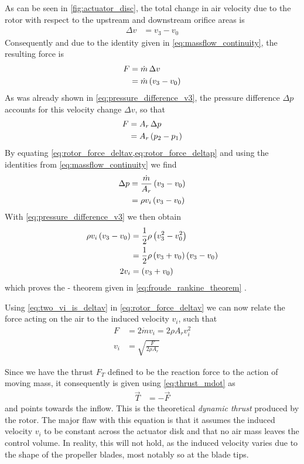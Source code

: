 As can be seen in \cref{fig:actuator_disc}, the total change in air velocity due to the rotor with respect to the upstream and downstream orifice areas is
%
\begin{align}
\Delta v &= v_3 - v_0
\end{align}
%
Consequently and due to the identity given in \cref{eq:massflow_continuity}, the resulting force is
%
\begin{align}
F &= \dot{m} \, \Delta v \\ 
  &= \dot{m} \left( v_3 - v_0 \right) \label{eq:rotor_force_deltav}
\end{align}
%
As was already shown in \cref{eq:pressure_difference_v3}, the pressure difference $\Delta p$ accounts for this velocity change $\Delta v$, so that
%
\begin{align}
F &= A_r \, \Delta p \\
  &= A_r \left( p_2 - p_1 \right) \label{eq:rotor_force_deltap}
\end{align}
%
By equating \cref{eq:rotor_force_deltav,eq:rotor_force_deltap} and using the identities from \cref{eq:massflow_continuity} we find
%
\begin{align}
 \Delta p &= \frac{\dot{m}}{A_r} \left( v_3 - v_0 \right) \\
                      &= \rho v_i \left( v_3 - v_0 \right)
\end{align}
%
With \cref{eq:pressure_difference_v3} we then obtain
%
\begin{align}
\rho v_i \left( v_3 - v_0 \right) &= \frac{1}{2} \rho \left( v^2_3 - v^2_0 \right) \label{eq:froude_rankine_proof} \\
         &= \frac{1}{2} \rho \left( v_3 + v_0 \right) \left( v_3 - v_0 \right) \notag \\
2 v_i &= \left( v_3 + v_0 \right) \label{eq:two_vi_is_deltav}
\end{align}
%
which proves the - theorem given in \cref{eq:froude_rankine_theorem} .

Using \cref{eq:two_vi_is_deltav} in \cref{eq:rotor_force_deltav} we can now relate the force acting on the air to the induced velocity $v_i$, such that
%
\begin{align}
F &= 2 \dot{m} v_i = 2 \rho A_r v^2_i \label{eq:thrust_mdot} \\
v_i &= \sqrt{\frac{F}{2 \rho A_r}}
\end{align}

Since we have the thrust $F_T$ defined to be the reaction force to the action of moving mass, it consequently is given using \cref{eq:thrust_mdot} as
%
\begin{align}
\vec{T} &= -\vec{F} \label{eq:thrust}
\end{align}
%
and points towards the inflow. 
This is the theoretical \textit{dynamic thrust} produced by the rotor. 
The major flaw with this equation is that it assumes the induced velocity $v_i$ to be constant across the actuator disk and that no air mass leaves the control volume.
In reality, this will not hold, as the induced velocity varies due to the shape of the propeller blades, most notably so at the blade tips.

